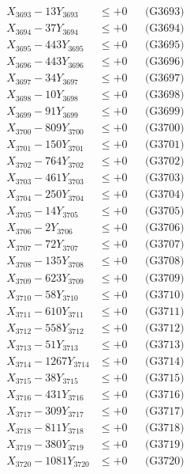 \documentclass[a4paper,10pt]{article}
\begin{document}
{\begin{align}
X_{3693} - 13Y_{3693} &\leq +0 && \text{(G3693)} \\
X_{3694} - 37Y_{3694} &\leq +0 && \text{(G3694)} \\
X_{3695} - 443Y_{3695} &\leq +0 && \text{(G3695)} \\
X_{3696} - 443Y_{3696} &\leq +0 && \text{(G3696)} \\
X_{3697} - 34Y_{3697} &\leq +0 && \text{(G3697)} \\
X_{3698} - 10Y_{3698} &\leq +0 && \text{(G3698)} \\
X_{3699} - 91Y_{3699} &\leq +0 && \text{(G3699)} \\
X_{3700} - 809Y_{3700} &\leq +0 && \text{(G3700)} \\
\allowbreak
X_{3701} - 150Y_{3701} &\leq +0 && \text{(G3701)} \\
X_{3702} - 764Y_{3702} &\leq +0 && \text{(G3702)} \\
X_{3703} - 461Y_{3703} &\leq +0 && \text{(G3703)} \\
X_{3704} - 250Y_{3704} &\leq +0 && \text{(G3704)} \\
X_{3705} - 14Y_{3705} &\leq +0 && \text{(G3705)} \\
X_{3706} - 2Y_{3706} &\leq +0 && \text{(G3706)} \\
X_{3707} - 72Y_{3707} &\leq +0 && \text{(G3707)} \\
X_{3708} - 135Y_{3708} &\leq +0 && \text{(G3708)} \\
X_{3709} - 623Y_{3709} &\leq +0 && \text{(G3709)} \\
X_{3710} - 58Y_{3710} &\leq +0 && \text{(G3710)} \\
\allowbreak
X_{3711} - 610Y_{3711} &\leq +0 && \text{(G3711)} \\
X_{3712} - 558Y_{3712} &\leq +0 && \text{(G3712)} \\
X_{3713} - 51Y_{3713} &\leq +0 && \text{(G3713)} \\
X_{3714} - 1267Y_{3714} &\leq +0 && \text{(G3714)} \\
X_{3715} - 38Y_{3715} &\leq +0 && \text{(G3715)} \\
X_{3716} - 431Y_{3716} &\leq +0 && \text{(G3716)} \\
X_{3717} - 309Y_{3717} &\leq +0 && \text{(G3717)} \\
X_{3718} - 811Y_{3718} &\leq +0 && \text{(G3718)} \\
X_{3719} - 380Y_{3719} &\leq +0 && \text{(G3719)} \\
X_{3720} - 1081Y_{3720} &\leq +0 && \text{(G3720)} \\

\end{align}}
\end{document}
